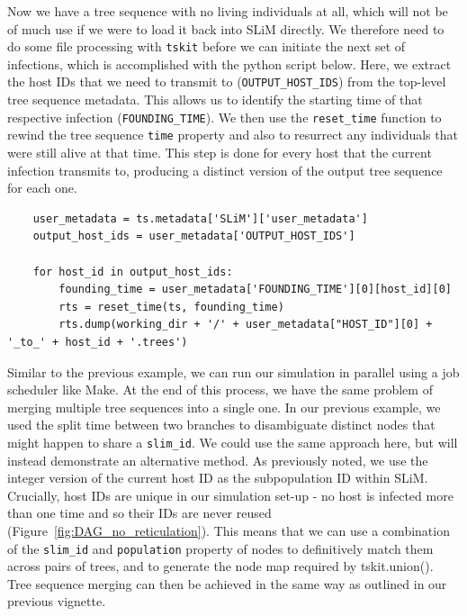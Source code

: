\documentclass[12pt]{article}
\newcommand{\tskit}[0]{\texttt{tskit}\xspace}
\begin{document}
Now we have a tree sequence with no living individuals at all, which will not be of much use if we were to load it back into SLiM directly. We therefore need to do some file processing
with \tskit before we can initiate the next set of infections, which is accomplished with the python script below. Here, we extract the host IDs that we need to transmit to (\verb|OUTPUT_HOST_IDS|)
from the top-level tree sequence metadata. This allows us to identify the starting time of that respective infection (\verb|FOUNDING_TIME|). We then use the \verb|reset_time| function to rewind
the tree sequence \verb|time| property and also to resurrect any individuals that were still alive at that time. This step is done for every host that the current infection transmits to, producing
a distinct version of the output tree sequence for each one.

\begin{verbatim}
    user_metadata = ts.metadata['SLiM']['user_metadata']
    output_host_ids = user_metadata['OUTPUT_HOST_IDS']

    for host_id in output_host_ids:
        founding_time = user_metadata['FOUNDING_TIME'][0][host_id][0]
        rts = reset_time(ts, founding_time)
        rts.dump(working_dir + '/' + user_metadata["HOST_ID"][0] + '_to_' + host_id + '.trees')
\end{verbatim}

Similar to the previous example, we can run our simulation in parallel using a job scheduler like Make. %
At the end of this process, we have the same problem of merging multiple tree sequences into a single one. In our previous example, we used the split time between two branches
to disambiguate distinct nodes that might happen to share a \verb|slim_id|. We could use the same approach here, but will instead demonstrate an alternative method. As previously
noted, we use the integer version of the current host ID as the subpopulation ID within SLiM. Crucially, host IDs are unique in our simulation set-up - no host is infected more than
one time and so their IDs are never reused  (Figure~\ref{fig:DAG_no_reticulation}). This means that we can use a combination of the \verb|slim_id| and \verb|population| property of nodes to
definitively match them across pairs of trees, and to generate the node map required by tskit.union(). Tree sequence merging can then be achieved in the same way as outlined
in our previous vignette. %
\end{document}
